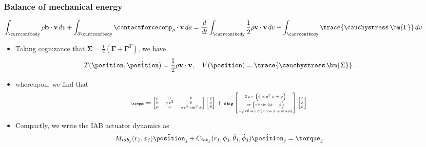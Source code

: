 \begin{frame}
	\frametitle{Balance of mechanical energy}
	\begin{align}
	\int_{\currconfbody} \rho \textbf{b}\cdot \textbf{v} \, dv + \int_{\partial \currconfbody} \contactforcecomp_\rho \cdot \textbf{v} \, da = \frac{d}{dt} \int_{\currconfbody} \frac{1}{2} \rho \textbf{v} \cdot \textbf{v} \, dv + \int_{\currconfbody}   \trace{\cauchystress\,\bm{\Gamma}} \, dv
	\end{align} 
	\begin{itemize}
		\item Taking cognizance that $\bm{\Sigma} = \frac{1}{2} (\bm{\Gamma} + \bm{\Gamma}^T)$, we have %
		\begin{align}
		T(\position, \dot{\position}) = \frac{1}{2} \rho \textbf{v} \cdot \textbf{v}, \quad V(\position) = %
		\trace{\cauchystress\,\bm{\Sigma}}.
		\end{align}
		\item whereupon, we find that
		\begin{align}
		\tiny
		\torque =
		\begin{bmatrix}
		\rho & 0 & 0   \\
		0 & \rho\, r^2 & 0   \\
		0 & 0 & \rho \, r^2 \sin^2\phi  
		\end{bmatrix}
		\begin{bmatrix}
		\ddot{r} \\ \ddot{\phi} \\ \ddot{\theta}
		\end{bmatrix} +
		\textbf{diag}\begin{bmatrix}
		2\, \rho \, r \,  \left(\dot{\theta}\,  \sin^2 \phi  + \dot{\phi}\right) \\
		\rho r \left( r\dot{\theta} \sin 2\phi -\dot{\phi} \right) \\ 
		- \rho r \dot{\theta} \sin \phi \left(r \cos\phi+\sin\phi \right)
		\end{bmatrix}
		\begin{bmatrix}
		\dot{r} \\ \dot{\phi} \\ \dot{\theta}
		\end{bmatrix}  
		\label{eq:lagrange-dynamics}
		\end{align}
		\item Compactly, we write the IAB actuator dynamics as
		\begin{align}
		M_{{iab}_j}(r_j, \phi_j) \ddot{\position}_j + C_{{iab}_j}(r_j, \phi_j, \dot{\theta}_j, \dot{\phi}_j) \dot{\position}_j  = \torque_j
		\label{eq:iab-dynamics-compos}
		\end{align} 
	\end{itemize}
\end{frame}


